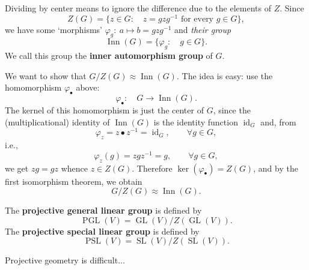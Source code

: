 \begin{add} Dividing by center means to ignore the difference due to the elements of $Z.$ Since $$Z(G) = \{z\in G:\quad z = gzg^{-1}\textrm{ for every }g\in G\},$$ we have some `morphisms' $\varphi_g:~a \mapsto b = gzg^{-1}$ and \textit{their group} $$\operatorname{Inn}(G) = \{ \varphi_g:\quad g \in G\}.$$ We call this group the \textbf{inner automorphism group} of $G$.

We want to show that $G/Z(G) \approx \operatorname{Inn}(G).$ The idea is easy: use the homomorphism $\varphi_\bullet$ above: $$\varphi_\bullet:\quad G \to \operatorname{Inn}(G).$$ The kernel of this homomorphism is just the center of $G$, since the (multiplicational) identity of $\operatorname{Inn}(G)$ is the identity function $\operatorname{id}_G$ and, from $$\varphi_z = z\bullet z^{-1} = \operatorname{id}_G, \qquad \forall g\in G,$$i.e., $$\varphi_z (g) = zgz^{-1} = g, \qquad \forall g\in G,$$ we get $zg = gz$ whence $z \in Z(G).$ Therefore $\ker (\varphi_\bullet) = Z(G)$, and by the first isomorphism theorem, we obtain $$G/Z(G) \approx \operatorname{Inn}(G).$$
\end{add}

\begin{defn}
The \textbf{projective general linear group} is defined by $$\operatorname{PGL}(V) = \operatorname{GL}(V)/Z(\operatorname{GL}(V)).$$
The \textbf{projective special linear group} is defined by $$\operatorname{PSL}(V) = \operatorname{SL}(V)/Z(\operatorname{SL}(V)).$$
\end{defn}

Projective geometry is difficult...

